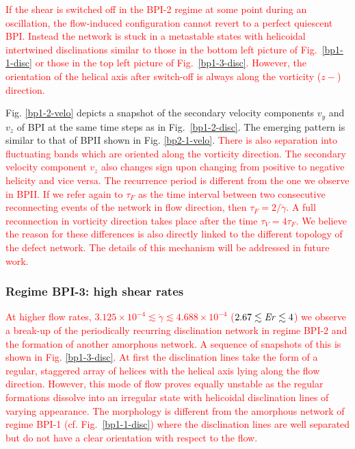 \documentclass[8.5pt,twoside,twocolumn]{article}
\newcommand{\e}[1]{\times10^{#1}}
\newcommand{\gd}{\dot{\gamma}}
\newcommand{\rev}[1]{{\textcolor{red}{#1}}}
\begin{document}
\rev{
If the shear is switched off in
the BPI-2 regime at some point during an oscillation, 
the flow-induced configuration cannot revert to a perfect quiescent BPI.
Instead the network is stuck in a metastable states with 
helicoidal intertwined disclinations similar to those in the bottom left 
picture of Fig.~\ref{bp1-1-disc} or those in the top left picture of Fig.~\ref{bp1-3-disc}.
However, the orientation of the helical axis after switch-off is always 
along the vorticity ($z-$) direction.
}

Fig. \ref{bp1-2-velo} depicts a snapshot of the secondary velocity 
components $v_y$ and $v_z$ of BPI at the same time steps as in Fig.~\ref{bp1-2-disc}. 
The emerging pattern is similar to that of BPII shown in
Fig. \ref{bp2-1-velo}. 
\rev{
There is also separation into fluctuating bands 
which are oriented along the vorticity direction.
The secondary velocity component $v_z$ also changes sign upon
changing from positive to negative helicity and vice versa.
The recurrence period is different from the one we observe in BPII.
If we refer again to $\tau_F$ as the time interval between two consecutive 
reconnecting events of the network in flow direction, then $\tau_F=2/\gd$. 
A full reconnection in vorticity direction takes place after the time $\tau_V=4 \tau_F$.
We believe the reason for these differences is also directly linked to the different
topology of the defect network. The details of this mechanism will be
addressed in future work.
} 

\subsubsection{Regime BPI-3: high shear rates }

\rev{
At higher flow rates, $3.125\e{-4}\lesssim\gd\lesssim4.688\e{-4}$ 
($2.67\lesssim {\it Er}\lesssim 4$) we observe a break-up of the 
periodically recurring disclination network in regime BPI-2 and the formation
of another amorphous network. A sequence of snapshots of this is shown in Fig. \ref{bp1-3-disc}. 
At first the disclination lines take the form of a regular, staggered array of helices 
with the helical axis lying along the flow direction.
However, this mode of flow proves equally unstable as the regular formations dissolve into 
an irregular state with helicoidal disclination lines of varying 
appearance. The morphology is different from the amorphous network of
regime BPI-1 (cf. Fig.~\ref{bp1-1-disc}) where the disclination lines are 
well separated but do not have a clear orientation with respect to the flow. 
}
\end{document}
